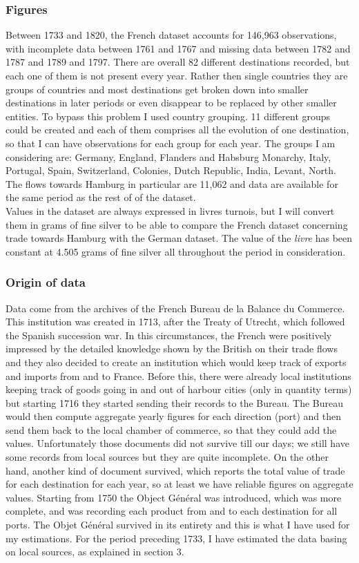\documentclass[12pt,a4paper,titlepage]{article}
\begin{document}
\subsubsection{Figures}
Between 1733 and 1820, the French dataset accounts for 146,963 observations, with incomplete data between 1761 and 1767 and missing data between 1782 and 1787 and 1789 and 1797. There are overall 82 different destinations recorded, but each one of them is not present every year. Rather then single countries they are groups of countries and most destinations get broken down into smaller destinations in later periods or even disappear to be replaced by other smaller entities. To bypass this problem I used country grouping. 11 different groups could be created and each of them comprises all the evolution of one destination, so that I can have observations for each group for each year. The groups I am considering are: Germany, England, Flanders and Habsburg Monarchy, Italy, Portugal, Spain, Switzerland, Colonies, Dutch Republic, India, Levant, North. The flows towards Hamburg in particular are 11,062 and data are available for the same period as the rest of of the dataset.\\
Values in the dataset are always expressed in livres turnois, but I will convert them in grams of fine silver to be able to compare the French dataset concerning trade towards Hamburg with the German dataset. The value of the \textit{livre} has been constant at 4.505 grams of fine silver all throughout the period in consideration. 

\subsubsection{Origin of data}
Data come from the archives of the French Bureau de la Balance du Commerce. This institution was created in 1713, after the Treaty of Utrecht, which followed the Spanish succession war. In this circumstances, the French were positively impressed by the detailed knowledge shown by the British on their trade flows and they also decided to create an institution which would keep track of exports and imports from and to France. Before this, there were already local institutions keeping track of goods going in and out of harbour cities (only in quantity terms) but starting 1716 they started sending their records to the Bureau. The Bureau would then compute aggregate yearly figures for each direction (port) and then send them back to the local chamber of commerce, so that they could add the values. Unfortunately those documents did not survive till our days; we still have some records from local sources but they are quite incomplete. On the other hand, another kind of document survived, which reports the total value of trade for each destination for each year, so at least we have reliable figures on aggregate values. Starting from 1750 the Object Général was introduced, which was more complete, and was recording each product from and to each destination for all ports. The Objet Général survived in its entirety and this is what I have used for my estimations. For the period preceding 1733, I have estimated the data basing on local sources, as explained in section 3. 
\end{document}
